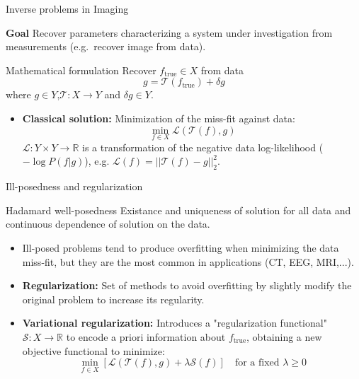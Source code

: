 \begin{frame}{Inverse problems in Imaging}
\begin{block}{\textbf{Goal}}
Recover parameters characterizing a system under investigation from measurements (e.g.\ recover image from data).
\end{block}
\pause
\bigskip

\begin{block}{Mathematical formulation}
Recover $f_{\text{true}}\in X$ from data
$$
g = \mathcal{T}(f_{\text{true}})+\delta g
$$
where $g\in Y$,$\mathcal{T}:X\longrightarrow Y$ and $\delta g\in Y$.
\end{block}

\pause
\bigskip

\begin{itemize}
\item \textbf{Classical solution:} 
Minimization of the miss-fit against data:
$$
\min_{f\in X}\mathcal{L}(\mathcal{T}(f),g)
$$
$\mathcal{L}:Y\times Y\longrightarrow \mathbb{R}$ is a transformation of the negative data log-likelihood ($-\log P(f|g)$), e.g. $\mathcal{L}(f)=||\mathcal{T}(f)-g||_2^2$.
\end{itemize}
\end{frame}

\begin{frame}{Ill-posedness and regularization}


\begin{block}{Hadamard well-posedness}
 Existance and uniqueness of solution for all data and continuous dependence of solution on the data.
\end{block}

\bigskip
\pause
\begin{itemize}
\item Ill-posed problems tend to produce overfitting when minimizing the data miss-fit, but they are the most common in applications (CT, EEG, MRI,...).

\bigskip
\pause
\item \textbf{Regularization:} Set of methods to avoid overfitting by slightly modify the original problem to increase its regularity.

\bigskip
\pause
\item \textbf{Variational regularization:} Introduces a "regularization functional" $\mathcal{S}:X\longrightarrow \mathbb{R}$ to encode a priori information about $f_{\text{true}}$, obtaining a new objective functional to minimize:
$$
\min_{f\in X}\left[\mathcal{L}(\mathcal{T}(f),g)+\lambda \mathcal{S}(f)\right]\quad \text{for a fixed $\lambda\geq 0$}
$$

\end{itemize}
\end{frame}


